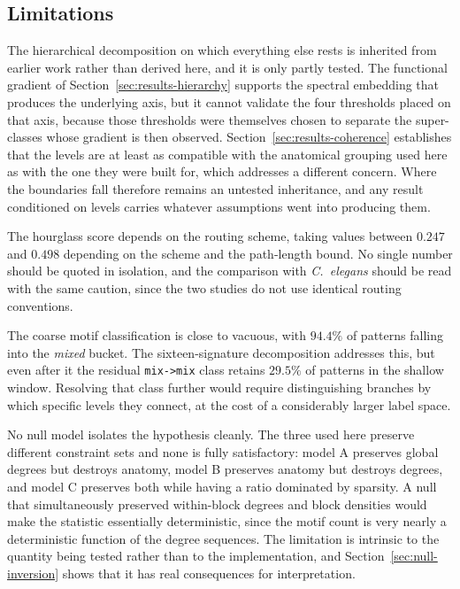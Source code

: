\documentclass[12pt,a4paper,oneside]{article}
\theoremstyle{definition}
\theoremstyle{plain}
\newcommand{\code}[1]{\texttt{#1}}
\begin{document}
\subsection{Limitations}

The hierarchical decomposition on which everything else rests is inherited
from earlier work rather than derived here, and it is only partly tested.
The functional gradient of Section~\ref{sec:results-hierarchy} supports the
spectral embedding that produces the underlying axis, but it cannot validate
the four thresholds placed on that axis, because those thresholds were
themselves chosen to separate the super-classes whose gradient is then
observed. Section~\ref{sec:results-coherence} establishes that the levels
are at least as compatible with the anatomical grouping used here as with
the one they were built for, which addresses a different concern. Where the
boundaries fall therefore remains an untested inheritance, and any result
conditioned on levels carries whatever assumptions went into producing
them.

The hourglass score depends on the routing scheme, taking values between
$0.247$ and $0.498$ depending on the scheme and the path-length bound. No
single number should be quoted in isolation, and the comparison with
\textit{C.\ elegans} should be read with the same caution, since the two
studies do not use identical routing conventions.

The coarse motif classification is close to vacuous, with $94.4\%$ of
patterns falling into the \emph{mixed} bucket. The sixteen-signature
decomposition addresses this, but even after it the residual
\code{mix->mix} class retains $29.5\%$ of patterns in the shallow window.
Resolving that class further would require distinguishing branches by which
specific levels they connect, at the cost of a considerably larger label
space.

No null model isolates the hypothesis cleanly. The three used here preserve
different constraint sets and none is fully satisfactory: model A preserves
global degrees but destroys anatomy, model B preserves anatomy but destroys
degrees, and model C preserves both while having a ratio dominated by
sparsity. A null that simultaneously preserved within-block degrees and
block densities would make the statistic essentially deterministic, since
the motif count is very nearly a deterministic function of the degree
sequences. The limitation is intrinsic to the quantity being tested rather
than to the implementation, and Section~\ref{sec:null-inversion} shows that
it has real consequences for interpretation.
\end{document}
